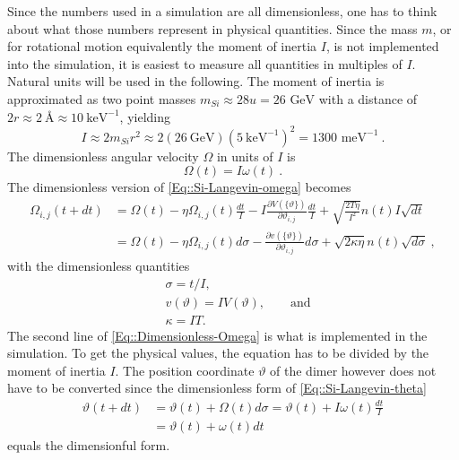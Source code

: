 	Since the numbers used in a simulation are all dimensionless, one has to think about what those numbers represent in physical quantities. Since the mass $m$, or for rotational motion equivalently the moment of inertia $I$, is not implemented into the simulation, it is easiest to measure all quantities in multiples of $I$. Natural units will be used in the following. The moment of inertia is approximated as two point masses $m_{Si} \approx 28u =	26 \text{ GeV}$ with a distance of $2r \approx 2 ~\text{\AA} \approx 10~ \text{keV}^{-1}$, yielding
	\begin{equation}
		I \approx 2m_{Si} r^2 \approx	2 \left(26 ~\text{GeV}\right) \left(5 ~\text{keV}^{-1}\right)^2 =	1300 \text{ meV}^{-1}~.
	\end{equation}
	The dimensionless angular velocity $\Omega$ in units of $I$ is
	\begin{equation}
		\Omega(t) =	I\omega(t)~.
	\end{equation}
	The dimensionless version of \autoref{Eq::Si-Langevin-omega} becomes
	\begin{equation} \label{Eq::Dimensionless-Omega}
		\begin{split}
			\Omega_{i,j}(t + dt) &=	\Omega(t) - \eta \Omega_{i,j}(t) \frac{dt}{I} - {I}\frac{\partial V(\{\vartheta\})}{\partial \vartheta_{i,j}} \frac{dt}{I} + \sqrt{\frac{2 T \eta}{I^2}} n(t) I \sqrt{dt} \\
			&=	\Omega(t) - \eta \Omega_{i,j}(t) d\sigma - \frac{\partial v(\{\vartheta\})}{\partial \vartheta_{i,j}} d\sigma + \sqrt{{2 \kappa \eta}} n(t) \sqrt{d\sigma}~,
		\end{split}
	\end{equation}
	with the dimensionless quantities
	\begin{align}
		&\sigma =	t /	I, \\
		&v(\vartheta) =	I V(\vartheta), \qquad \text{and} \\
		&\kappa =	IT.
	\end{align}
	The second line of \autoref{Eq::Dimensionless-Omega} is what is implemented in the simulation. To get the physical values, the equation has to be divided by the moment of inertia $I$. The position coordinate $\vartheta$ of the dimer however does not have to be converted since the dimensionless form of \autoref{Eq::Si-Langevin-theta}
	\begin{equation}
		\begin{split}
			\vartheta(t + dt) &=	\vartheta(t) + \Omega(t) d\sigma =	\vartheta(t) + I \omega(t) \frac{dt}{I} \\
			&= \vartheta(t) + \omega(t) dt
		\end{split}
	\end{equation}
	equals the dimensionful form. \\
	
